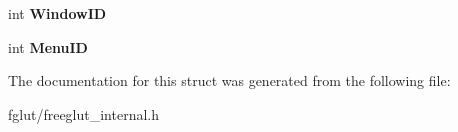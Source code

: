 \begin{DoxyCompactItemize}
\item 
int {\bfseries Window\+ID}\hypertarget{structtag_s_f_g___structure_a845c15290ad69251123391d42db3ace2}{}\label{structtag_s_f_g___structure_a845c15290ad69251123391d42db3ace2}

\item 
int {\bfseries Menu\+ID}\hypertarget{structtag_s_f_g___structure_a5ebcb137c87d1a7118d503c8675e34b3}{}\label{structtag_s_f_g___structure_a5ebcb137c87d1a7118d503c8675e34b3}

\end{DoxyCompactItemize}


The documentation for this struct was generated from the following file\+:\begin{DoxyCompactItemize}
\item 
fglut/freeglut\+\_\+internal.\+h\end{DoxyCompactItemize}
